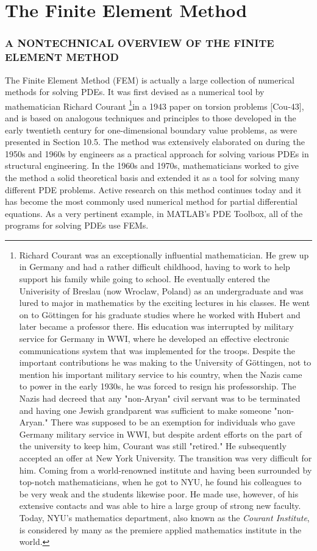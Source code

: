 \documentclass[../main.tex]{subfiles}
\begin{document}
\newpage

\chapter{The Finite Element Method }

\subsection{A NONTECHNICAL OVERVIEW OF THE FINITE ELEMENT 
METHOD}

The Finite Element Method (FEM) is actually a large collection of numerical methods for solving PDEs. It was first devised as a numerical tool by mathematician Richard Courant
\footnote{Richard Courant was an exceptionally influential mathematician. He grew up in Germany and had a rather difficult childhood, having to work to help support his family while going to school. He eventually entered the Univerisity of Breslau (now Wroclaw, Poland) as an undergraduate and was lured to major in mathematics by the exciting lectures in his classes. He went on to Göttingen for his graduate studies where he worked with Hubert and later became a professor there. His education was interrupted by military service for Germany in WWI, where he developed an effective electronic communications system that was implemented for the troops. Despite the important contributions he was making to the University of Göttingen, not to mention his important military service to his country, when the Nazis came to power in the early 1930s, he was forced to resign his professorship. The Nazis had decreed that any "non-Aryan" civil servant was to be terminated and having one Jewish grandparent was sufficient to make someone "non-Aryan." There was supposed to be an exemption for individuals who gave Germany military service in WWI, but despite ardent efforts on the part of the university to keep him, Courant was still "retired." He subsequently accepted an offer at New York University. The transition was very difficult for him. Coming from a world-renowned institute and having been surrounded by top-notch mathematicians, when he got to NYU, he found his colleagues to be very weak and the students likewise poor. He made use, however, of his extensive contacts and was able to hire a large group of strong new faculty. Today, NYU's mathematics department, also known as the \textit{Courant Institute}, is considered by many as the premiere applied mathematics institute in the world.}in a 1943 paper on torsion problems [Cou-43], and is based on analogous techniques and principles to those developed in the early twentieth century for one-dimensional boundary value problems, as were presented in Section 10.5. The method was extensively elaborated on during the 1950s and 1960s by engineers as a practical approach for solving various PDEs in structural engineering. In the 1960s and 1970s, mathematicians worked to give the method a solid theoretical basis and extended it as a tool for solving many different PDE problems. Active research on this method continues today and it has become the most commonly used numerical method for partial differential equations. As a very pertinent example, in MATLAB's PDE Toolbox, all of the programs for solving PDEs use FEMs. 
\end{document}
